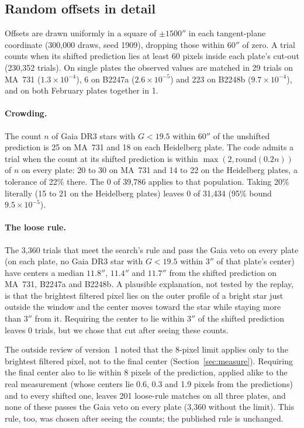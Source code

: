 \documentclass[11pt]{article}
\begin{document}
\begin{appendices}
\section{Random offsets in detail}
\label{app:chance}

Offsets are drawn uniformly in a square of $\pm1500''$ in each tangent-plane coordinate (300,000 draws, seed 1909), dropping those within $60''$ of zero. A trial counts when its shifted prediction lies at least 60 pixels inside each plate's cut-out (230,352 trials). On single plates the observed values are matched in 29 trials on MA~731 ($1.3\times10^{-4}$), 6 on B2247a ($2.6\times10^{-5}$) and 223 on B2248b ($9.7\times10^{-4}$), and on both February plates together in 1.

\paragraph{Crowding.} The count $n$ of Gaia DR3 stars with $G<19.5$ within $60''$ of the unshifted prediction is 25 on MA~731 and 18 on each Heidelberg plate. The code admits a trial when the count at its shifted prediction is within $\max(2,\mathrm{round}(0.2n))$ of $n$ on every plate: 20 to 30 on MA~731 and 14 to 22 on the Heidelberg plates, a tolerance of 22\% there. The 0 of 39,786 applies to that population. Taking 20\% literally (15 to 21 on the Heidelberg plates) leaves 0 of 31,434 (95\% bound $9.5\times10^{-5}$).

\paragraph{The loose rule.} The 3,360 trials that meet the search's rule and pass the Gaia veto on every plate (on each plate, no Gaia DR3 star with $G<19.5$ within $3''$ of that plate's center) have centers a median $11.8''$, $11.4''$ and $11.7''$ from the shifted prediction on MA~731, B2247a and B2248b. A plausible explanation, not tested by the replay, is that the brightest filtered pixel lies on the outer profile of a bright star just outside the window and the center moves toward the star while staying more than $3''$ from it. Requiring the center to lie within $3''$ of the shifted prediction leaves 0 trials, but we chose that cut after seeing these counts.

The outside review of version~1 noted that the 8-pixel limit applies only to the brightest filtered pixel, not to the final center (Section~\ref{sec:measure}). Requiring the final center also to lie within 8 pixels of the prediction, applied alike to the real measurement (whose centers lie 0.6, 0.3 and 1.9 pixels from the predictions) and to every shifted one, leaves 201 loose-rule matches on all three plates, and none of these passes the Gaia veto on every plate (3,360 without the limit). This rule, too, was chosen after seeing the counts; the published rule is unchanged.


\end{appendices}
\end{document}
